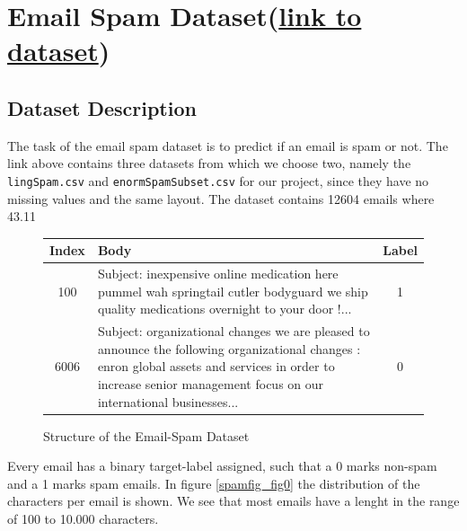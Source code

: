 \documentclass[11pt]{article}
\begin{document}
\section{Email Spam Dataset(\href{https://www.kaggle.com/nitishabharathi/email-spam-dataset}{link to dataset})}


\subsection{Dataset Description}
The task of the email spam dataset is to predict if an email is spam or not. The link above contains three datasets from which we choose two, namely the \texttt{lingSpam.csv} and \texttt{enormSpamSubset.csv} for our project, since they have no missing values and the same layout. The dataset contains 12604 emails where 43.11%

\begin{figure}[h]
  \begin{tabular}{ | c | p{15cm} | c |}
    \hline
    Index & Body & Label \\
    \hline
    100 & 
    Subject: inexpensive online medication here
 pummel wah springtail cutler bodyguard
 we ship quality medications overnight to your door !...
    & 1 \\ \hline
    6006
    &
    Subject: organizational changes
 we are pleased to announce the following organizational changes :
 enron global assets and services
 in order to increase senior management focus on our international businesses... 
    & 0 \\
    \hline
    \end{tabular}
    \caption{Structure of the Email-Spam Dataset}
    \label{tab_spam0}
  \end{figure}
Every email has a binary target-label assigned, such that a 0 marks non-spam and a 1 marks spam emails. In figure \ref{spamfig_fig0} the distribution of the characters per email is shown. We see that most emails have a lenght in the range of 100 to 10.000 characters.
\end{document}
